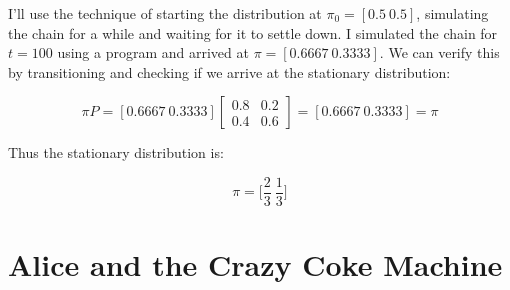 \documentclass[fleqn]{hermans-hw}
\begin{document}
\begin{enumerate}
I'll use the technique of starting the distribution at $\pi_0 = [0.5 \ 0.5]$, simulating the chain for a while and waiting for it to settle down. I simulated the chain for $t = 100$ using a program and arrived at $\pi = [0.6667 \ 0.3333]$. We can verify this by transitioning and checking if we arrive at the stationary distribution:

$$\pi P = [0.6667 \ 0.3333] \begin{bmatrix}
 0.8 & 0.2 \\
 0.4 & 0.6
\end{bmatrix} = [0.6667 \ 0.3333] = \pi$$

Thus the stationary distribution is:

$$\boxed{\pi = \Big[\frac{2}{3} \ \frac{1}{3}\Big]}$$
\end{enumerate}
\vspace{-0.5cm}
\section{Alice and the Crazy Coke Machine}
\end{document}
